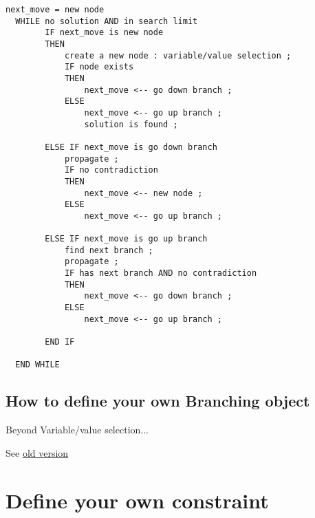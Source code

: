 \begin{lstlisting}[title={Algorithm of the search loop in Choco}]
  next_move = new node
  WHILE no solution AND in search limit
        IF next_move is new node
	    THEN
	        create a new node : variable/value selection ;
	        IF node exists 
	        THEN
	            next_move <-- go down branch ;            
	        ELSE 
	            next_move <-- go up branch ;
	            solution is found ;
	
	    ELSE IF next_move is go down branch
	        propagate ;
	        IF no contradiction 
	        THEN
	            next_move <-- new node ;                        
	        ELSE
	            next_move <-- go up branch ;
	        
	    ELSE IF next_move is go up branch 
	        find next branch ;
	        propagate ;
	        IF has next branch AND no contradiction
	        THEN
	            next_move <-- go down branch ;                            
	        ELSE
	            next_move <-- go up branch ;
	
	    END IF
	
  END WHILE
\end{lstlisting}

\subsection{How to define your own Branching object}\label{advanced:beyondvariable/valueselection,howtodefineyourownbranchingobject}\hypertarget{advanced:beyondvariable/valueselection,howtodefineyourownbranchingobject}{}

Beyond Variable/value selection...

 See \href{http://choco-solver.net/index.phptitle=userguide:beyondvariable.2fvalueselection.2chowtodefineyourownbranchingobject}{old version}

\section{Define your own constraint}\label{advanced:defineyourownconstraint}\hypertarget{advanced:defineyourownconstraint}{}

